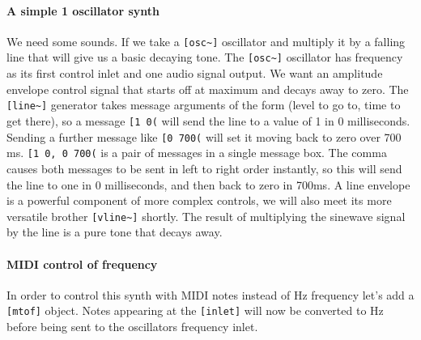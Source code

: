 \paragraph{A simple 1 oscillator synth}
We need some sounds. If we take a \verb+[osc~]+ oscillator and multiply it
by a falling line that will give us a basic decaying tone. The \verb+[osc~]+ oscillator has
frequency as its first control inlet and one audio signal output. We want an
amplitude envelope control signal that starts off at maximum and decays away to zero. The
\verb+[line~]+ generator takes message arguments of the form (level to go
to, time to get there), so a message \verb+[1 0(+ will send the line 
to a value of 1 in 0 milliseconds. Sending a further message like
\verb+[0 700(+ will set it moving back to zero
over 700 ms.   \verb+[1 0, 0 700(+ is a pair of messages
in a single message box. The comma causes both messages to be sent in left to
right order instantly, so this will send the
line to one in 0 milliseconds, and then back to zero in 700ms.  A line envelope is a powerful component of more
complex controls, we will also meet its more versatile brother
\verb+[vline~]+ shortly. The result of multiplying the sinewave signal by the line is a pure
tone that decays away. 

\paragraph{MIDI control of frequency}
In order to control this synth with MIDI notes instead of Hz frequency let's
add a \verb+[mtof]+ object. Notes appearing at the \verb+[inlet]+ will now be converted to Hz
before being sent to the oscillators frequency inlet.